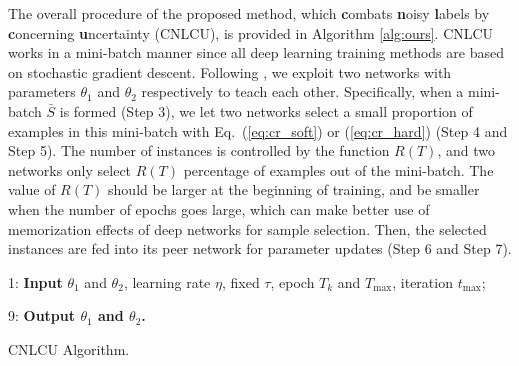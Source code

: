 \documentclass[11pt]{article}
\begin{document}
The overall procedure of the proposed method, which \textbf{c}ombats \textbf{n}oisy \textbf{l}abels by \textbf{c}oncerning \textbf{u}ncertainty (CNLCU), is provided in Algorithm \ref{alg:ours}. CNLCU works in a mini-batch manner since all deep learning training methods are based on stochastic gradient descent. Following \citep{han2018co}, we exploit two networks with parameters $\theta_1$ and $\theta_2$ respectively to teach each other. Specifically, when a mini-batch $\bar{S}$ is formed (Step 3), we let two networks select a small proportion of examples in this mini-batch with Eq.~(\ref{eq:cr_soft}) or (\ref{eq:cr_hard}) (Step 4 and Step 5). The number of instances is controlled by the function $R(T)$, and two networks only select $R(T)$ percentage of examples out of the mini-batch. The value of $R(T)$ should be larger at the beginning of training, and be smaller when the number of epochs goes large, which can make better use of memorization effects of deep networks \citep{han2018co} for sample selection. Then, the selected instances are fed into its peer network for parameter updates (Step 6 and Step 7). 
\vspace{-5pt}
\begin{algorithm}[!t]
1: {\bfseries Input} $\theta_1$ and $\theta_2$, learning rate $\eta$, fixed $\tau$, epoch $T_{k}$ and $T_{\max}$, iteration $t_{\max}$;


9: {\bfseries Output $\theta_1$ and $\theta_2$.}
\caption{CNLCU Algorithm.}
\label{alg:ours}
\end{algorithm}
\vspace{-5pt}
\end{document}
